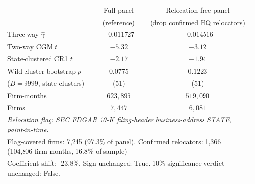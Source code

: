 \begin{tabular}{lcc}
\hline\hline
 & Full panel & Relocation-free panel \\
 & (reference) & (drop confirmed HQ relocators) \\
\hline
Three-way $\hat\gamma$ & $-0.011727$ & $-0.014516$ \\
Two-way CGM $t$ & $-5.32$ & $-3.12$ \\
State-clustered CR1 $t$ & $-2.17$ & $-1.94$ \\
Wild-cluster bootstrap $p$ & $0.0775$ & $0.1223$ \\
\quad ($B=9999$, state clusters) & (51) & (51) \\
Firm-months & $623,896$ & $519,090$ \\
Firms & $7,447$ & $6,081$ \\
\hline
\multicolumn{3}{l}{\textit{Relocation flag: SEC EDGAR 10-K filing-header business-address STATE, point-in-time.}} \\
\multicolumn{3}{l}{Flag-covered firms: 7,245 (97.3\% of panel). Confirmed relocators: 1,366 (104,806 firm-months, 16.8\% of sample).} \\
\multicolumn{3}{l}{Coefficient shift: -23.8\%. Sign unchanged: True. 10\%-significance verdict unchanged: False.} \\
\hline\hline
\end{tabular}
